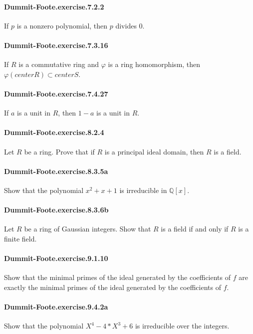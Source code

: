 \documentclass{article}
\begin{document}
\paragraph{Dummit-Foote.exercise.7.2.2} If $p$ is a nonzero polynomial, then $p$ divides $0$.

\paragraph{Dummit-Foote.exercise.7.3.16} If $R$ is a commutative ring and $φ$ is a ring homomorphism, then $φ (center R) ⊂ center S$.

\paragraph{Dummit-Foote.exercise.7.4.27} If $a$ is a unit in $R$, then $1-a$ is a unit in $R$.

\paragraph{Dummit-Foote.exercise.8.2.4} Let $R$ be a ring. Prove that if $R$ is a principal ideal domain, then $R$ is a field.

\paragraph{Dummit-Foote.exercise.8.3.5a} Show that the polynomial $x^2 + x + 1$ is irreducible in $\mathbb{Q}[x]$.

\paragraph{Dummit-Foote.exercise.8.3.6b} Let $R$ be a ring of Gaussian integers. Show that $R$ is a field if and only if $R$ is a finite field.

\paragraph{Dummit-Foote.exercise.9.1.10} Show that the minimal primes of the ideal generated by the coefficients of $f$ are exactly the minimal primes of the ideal generated by the coefficients of $f$.

\paragraph{Dummit-Foote.exercise.9.4.2a} Show that the polynomial $X^4 - 4*X^3 + 6$ is irreducible over the integers.
\end{document}
